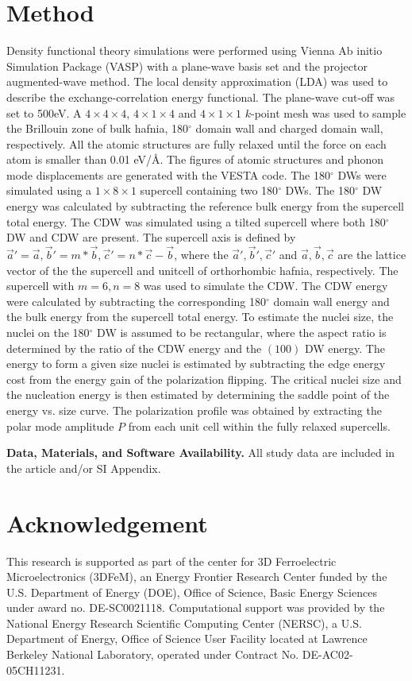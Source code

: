 \documentclass[12pt]{article}
\begin{document}
\section*{Method}
Density functional theory simulations were performed using Vienna Ab initio Simulation Package (VASP)\cite{kresse96p15,kresse96p11169} with a plane-wave basis set and the projector augmented-wave method\cite{blochl94p17953,kresse99p1758}.
The local density approximation (LDA) was used to describe the exchange-correlation energy functional. 
The plane-wave cut-off was set to 500eV.
A $4\times4\times4$, $4\times1\times4$ and $4\times1\times1$ $k$-point mesh was used to sample the Brillouin zone of bulk hafnia, 180$^\circ$ domain wall and charged domain wall, respectively.
All the atomic structures are fully relaxed until the force on each atom is smaller than 0.01 eV/{\AA}.
The figures of atomic structures and phonon mode displacements are generated with the VESTA code\cite{Momma21p1272}.
The 180$^\circ$ DWs were simulated using a $1\times8\times1$ supercell containing two 180$^\circ$ DWs. 
The 180$^\circ$ DW energy was calculated by subtracting the reference bulk energy from the supercell total energy.
The CDW was simulated using a tilted supercell where both 180$^\circ$ DW and CDW are present. 
The supercell axis is defined by $\vec{a}'=\vec{a}, \vec{b}'=m*\vec{b}, \vec{c}'=n*\vec{c}-\vec{b}$, where the $\vec{a}',\vec{b}',\vec{c}'$ and $\vec{a},\vec{b},\vec{c}$ are the lattice vector of the the supercell and unitcell of orthorhombic hafnia, respectively.
The supercell with $m=6,n=8$ was used to simulate the CDW.
The CDW energy were calculated by subtracting the corresponding 180$^\circ$ domain wall energy and the bulk energy from the supercell total energy. 
To estimate the nuclei size, the nuclei on the 180$^\circ$ DW is assumed to be rectangular, where the aspect ratio is determined by the ratio of the CDW energy and the $(100)$ DW energy.
The energy to form a given size nuclei is estimated by subtracting the edge energy cost from the energy gain of the polarization flipping. 
The critical nuclei size and the nucleation energy is then estimated by determining the saddle point of the energy vs. size curve. 
The polarization profile was obtained by extracting the polar mode amplitude $P$ from each unit cell within the fully relaxed supercells. 

{\bf{Data, Materials, and Software Availability.}}
All study data are included in the article and/or SI Appendix.
\section*{Acknowledgement}
This research is supported as part of the center for 3D Ferroelectric Microelectronics (3DFeM), an Energy Frontier Research Center funded by the U.S. Department of Energy (DOE), Office of Science, Basic Energy Sciences under award no. DE-SC0021118. Computational support was provided by the National Energy Research Scientific Computing Center (NERSC), a U.S. Department of Energy, Office of Science User Facility located at Lawrence Berkeley National Laboratory, operated under Contract No. DE-AC02-05CH11231.
\end{document}
